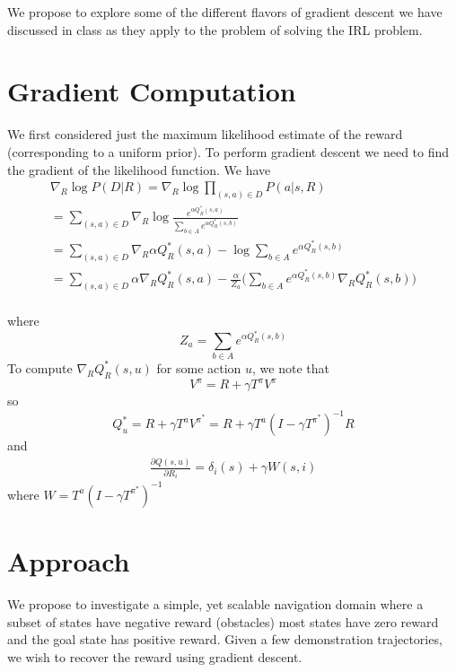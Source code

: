 \documentclass[10pt,a4paper]{article}
\begin{document}
We propose to explore some of the different flavors of gradient descent we have discussed in class as they apply to the problem of solving the IRL problem.

\section{Gradient Computation}
We first considered just the maximum likelihood estimate of the reward (corresponding to a uniform prior). To perform gradient descent we need to find the gradient of the likelihood function. We have 
\begin{eqnarray}
\nabla_R \log P(D | R) = \nabla_R \log \prod_{(s,a) \in D} P(a | s, R) \\
=\sum_{(s,a) \in D} \nabla_R \log \frac{e^{\alpha Q_R^*(s,a)}}{\sum_{b \in A} e^{\alpha Q_R^*(s,b)}}\\
= \sum_{(s,a) \in D} \nabla_R \alpha Q_R^*(s,a) - \log \sum_{b \in A} e^{\alpha Q_R^*(s,b)}\\
= \sum_{(s,a) \in D} \alpha \nabla_R Q_R^*(s,a) - \frac{\alpha}{Z_a}\bigg(\sum_{b \in A} e^{\alpha Q_R^*(s,b)} \nabla_R Q_R^*(s,b)\bigg)\\
\end{eqnarray}

where 
\begin{equation}
Z_a = \sum_{b \in A} e^{\alpha Q_R^*(s,b)}
\end{equation}
To compute $\nabla_R Q^*_R(s,u)$ for some action $u$, we note that 
\begin{equation}
V^{\pi} = R + \gamma T^{\pi} V^{\pi}
\end{equation}
so 
\begin{equation}
Q^*_u = R + \gamma T^a V^{\pi^*} = R + \gamma T^a(I - \gamma T^{\pi^*})^{-1}R
\end{equation}
and
\begin{eqnarray}
\frac{\partial Q(s,u)}{\partial R_i} = \delta_i(s) + \gamma W(s,i)
\end{eqnarray}
where $W = T^a(I - \gamma T^{\pi^*})^{-1}$

\section{Approach}
We propose to investigate a simple, yet scalable navigation domain where a subset of states have negative reward (obstacles) most states have zero reward and the goal state has positive reward. Given a few demonstration trajectories, we wish to recover the reward using gradient descent.
\end{document}
